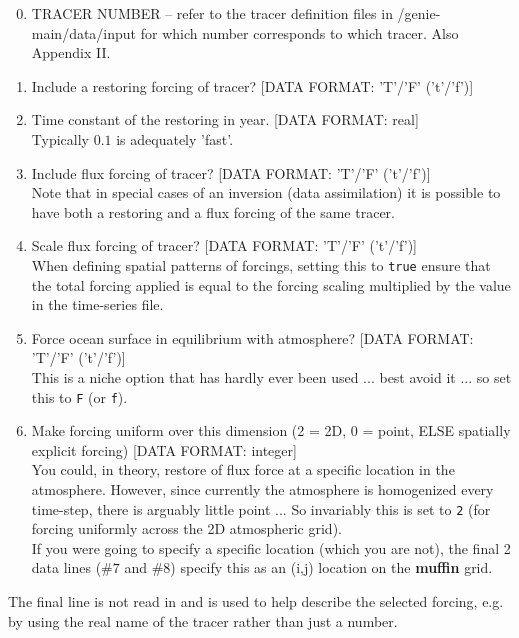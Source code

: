 \vspace{1mm}
\begin{enumerate}[noitemsep]
\setlength{\itemindent}{-0.0in}
\setcounter{enumi}{-1}
\item TRACER NUMBER -- refer to the tracer definition files in \textsf{\footnotesize /genie-main/data/input} for which number corresponds to which tracer. Also Appendix II.
\item Include a restoring forcing of tracer? [DATA FORMAT: 'T'/'F' ('t'/'f')]
\item Time constant of the restoring in year. [DATA FORMAT: real]
\\Typically \(0.1\) is adequately 'fast'.
\item Include flux forcing of tracer? [DATA FORMAT: 'T'/'F' ('t'/'f')] 
\\Note that in special cases of an inversion (data assimilation) it is possible to have both a restoring and a flux forcing of the same tracer.
\item Scale flux forcing of tracer? [DATA FORMAT: 'T'/'F' ('t'/'f')]
\\When defining spatial patterns of  forcings, setting this to \texttt{true} ensure that the total forcing applied is equal to the forcing scaling multiplied by the value in the time-series file. 
\item Force ocean surface in equilibrium with atmosphere? [DATA FORMAT: 'T'/'F' ('t'/'f')]
\\This is a niche option that has hardly ever been used ... best avoid it ... so set this to \texttt{F} (or \texttt{f}).
\item Make forcing uniform over this dimension (2 = 2D, 0 = point, ELSE spatially explicit forcing) [DATA FORMAT: integer]
\\You could, in theory, restore of flux force at a specific location in the atmosphere. However, since currently the atmosphere is homogenized every time-step, there is arguably little point ... So invariably this is set to \texttt{2} (for forcing uniformly across the 2D atmospheric grid).
\\If you were going to specify a specific location (which you are not), the final 2 data lines (\#\(7\) and \#\(8\)) specify this as an (i,j) location on the \textbf{muffin} grid.
\end{enumerate}

The final line is not read in and is used to help describe the selected forcing, e.g. by using the real name of the tracer rather than just a number.

